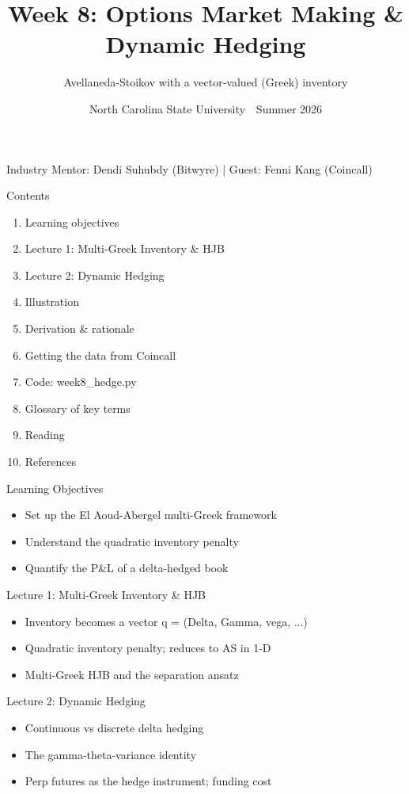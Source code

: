 \documentclass[aspectratio=169,10pt]{beamer}
\title{Week 8: Options Market Making \& Dynamic Hedging}
\subtitle{Avellaneda-Stoikov with a vector-valued (Greek) inventory}
\date{North Carolina State University \,\textbar\, Summer 2026}
\begin{document}
\begin{frame}[plain]\titlepage\begin{center}\tiny Industry Mentor: Dendi Suhubdy (Bitwyre)  |  Guest: Fenni Kang (Coincall)\end{center}\end{frame}
\begin{frame}{Contents}
\small\begin{enumerate}\setlength{\itemsep}{3pt}
  \item Learning objectives
  \item Lecture 1: Multi-Greek Inventory \& HJB
  \item Lecture 2: Dynamic Hedging
  \item Illustration
  \item Derivation \& rationale
  \item Getting the data from Coincall
  \item Code: week8\_hedge.py
  \item Glossary of key terms
  \item Reading
  \item References
\end{enumerate}
\end{frame}

\begin{frame}{Learning Objectives}
\begin{itemize}
  \item Set up the El Aoud-Abergel multi-Greek framework
  \item Understand the quadratic inventory penalty
  \item Quantify the P\&L of a delta-hedged book
\end{itemize}
\end{frame}

\begin{frame}{Lecture 1: Multi-Greek Inventory \& HJB}
\begin{itemize}
  \item Inventory becomes a vector q = (Delta, Gamma, vega, ...)
  \item Quadratic inventory penalty; reduces to AS in 1-D
  \item Multi-Greek HJB and the separation ansatz
\end{itemize}
\end{frame}

\begin{frame}{Lecture 2: Dynamic Hedging}
\begin{itemize}
  \item Continuous vs discrete delta hedging
  \item The gamma-theta-variance identity
  \item Perp futures as the hedge instrument; funding cost
\end{itemize}
\end{frame}
\end{document}

